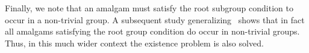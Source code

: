 \documentclass[12pt]{amsart}
\theoremstyle{definition}
\begin{document}
Finally, we note that an amalgam must satisfy the root subgroup condition to occur in a non-trivial group.
A subsequent study generalizing~\cite{BloHof2014a,BloHof2016} shows that in fact all amalgams satisfying the root group condition do occur in non-trivial groups. Thus, in this much wider context the existence problem is also solved.
%
% 
%
%
%
\end{document}
